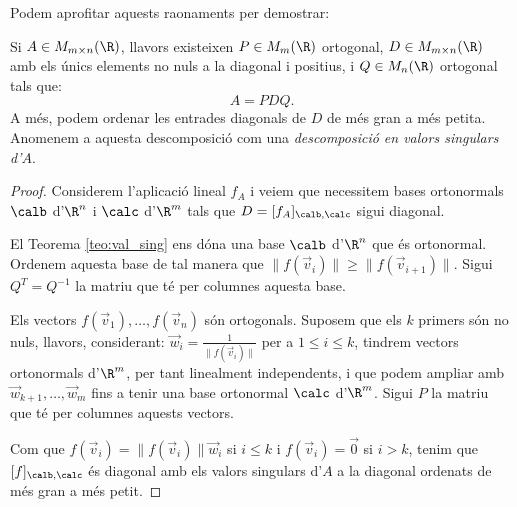 Podem aprofitar aquests raonaments per demostrar:
\begin{teorema}\label{teo:SVD}
Si $A\in M_{m\times n}(\R)$, llavors existeixen $P \in M_{m}(\R)$ ortogonal, $D\in M_{m\times n}(\R)$ amb els únics elements no nuls a la diagonal i positius, i $Q\in M_n(\R)$ ortogonal tals que:
\[
A=PDQ.
\]
A més, podem ordenar les entrades diagonals de $D$ de més gran a més petita. Anomenem a aquesta descomposició com una \emph{descomposició en valors singulars d'$A$}.
\end{teorema}
\begin{proof}
Considerem l'aplicació lineal $f_A$ i veiem que necessitem bases ortonormals $\calb$ d'$\R^n$ i $\calc$ d'$\R^m$ tals que $D=[f_A]_{\calb,\calc}$ sigui diagonal.

El Teorema \ref{teo:val_sing} ens dóna una base $\calb$ d'$\R^n$ que és ortonormal. Ordenem aquesta base de tal manera que $\|f(\vec v_i)\|\geq \|f(\vec v_{i+1})\|$. Sigui $Q^T=Q^{-1}$ la matriu que té per columnes aquesta base.

Els vectors $f(\vec v_1), \dots, f(\vec v_n)$ són ortogonals. Suposem que els $k$ primers són no nuls, llavors, considerant:
$\vec w_i=\frac{1}{\|f(\vec v_i)\|}$ per a $1\leq i \leq k$, tindrem vectors ortonormals d'$\R^m$, per tant linealment independents, i que podem ampliar amb $\vec w_{k+1}, \dots, \vec w_m$ fins a tenir una base ortonormal $\calc$ d'$\R^m$. Sigui $P$ la matriu que té per columnes aquests vectors.

Com que $f(\vec v_i)=\|f(\vec v_i)\| \vec w_i$ si $i\leq k$ i $f(\vec v_i)=\vec 0$ si $i>k$, tenim que $[f]_{\calb,\calc}$ és diagonal amb els valors singulars d'$A$ a la diagonal ordenats de més gran a més petit.
\end{proof}

